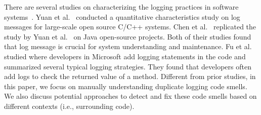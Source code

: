 There are several studies on characterizing the logging practices in software systems~\cite{Yuan:2012:CLP:2337223.2337236, Chen2017,Fu:2014:DLE:2591062.2591175}. Yuan et al.~\cite{Yuan:2012:CLP:2337223.2337236} conducted a quantitative characteristics study on log messages for large-scale open source C/C++ systems. Chen et al.~\cite{Chen2017} replicated the study by Yuan et al.~\cite{Yuan:2012:CLP:2337223.2337236} on Java open-source projects. Both of their studies found that log message is crucial for system understanding and maintenance. Fu et al.~\cite{Fu:2014:DLE:2591062.2591175} studied where developers in Microsoft add logging statements in the code and summarized several typical logging strategies. They found that developers often add logs to check the returned value of a method. %
Different from prior studies, in this paper, we focus on manually understanding duplicate logging code smells. We also discuss potential approaches to detect and fix these code smells based on different contexts (i.e., surrounding code).

